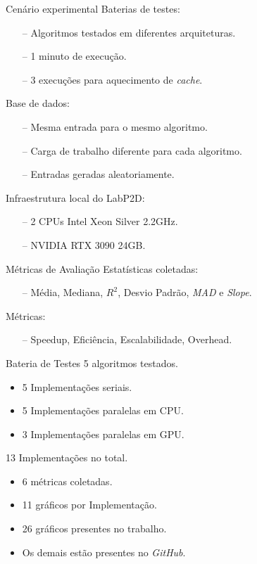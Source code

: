 \begin{frame}{Cenário experimental}
    Baterias de testes:
    \begin{itemize}
        \item[--] Algoritmos testados em diferentes arquiteturas.
        \item[--] 1 minuto de execução.
        \item[--] 3 execuções para aquecimento de \textit{cache}.
    \end{itemize} 
    \vspace{1em}
    Base de dados:
    \begin{itemize}
        \item[--] Mesma entrada para o mesmo algoritmo.
        \item[--] Carga de trabalho diferente para cada algoritmo.
        \item[--] Entradas geradas aleatoriamente.
    \end{itemize}
    \vspace{1em}
    Infraestrutura local do LabP2D:
    \begin{itemize}
        \item[--] 2 CPUs Intel Xeon Silver 2.2GHz.
        \item[--] NVIDIA RTX 3090 24GB.
    \end{itemize}
\end{frame}

\begin{frame}{Métricas de Avaliação}
    Estatísticas coletadas:
    \begin{itemize}
        \item[--] Média, Mediana, $R^2$, Desvio Padrão, \textit{MAD} e \textit{Slope}.
    \end{itemize}
    \vspace{1em}
    Métricas:
    \begin{itemize}
        \item[--] Speedup, Eficiência, Escalabilidade, Overhead.
    \end{itemize}
\end{frame}

\begin{frame}{Bateria de Testes}
    5 algoritmos testados.
    \begin{itemize}
        \item 5 Implementações seriais.
        \item 5 Implementações paralelas em CPU.
        \item 3 Implementações paralelas em GPU.
    \end{itemize}
    13 Implementações no total.
    \vspace{1em}
    \begin{itemize}
        \item 6 métricas coletadas.
        \item 11 gráficos por Implementação.
        \item 26 gráficos presentes no trabalho.
        \item Os demais estão presentes no \textit{GitHub}.
    \end{itemize}
\end{frame}

